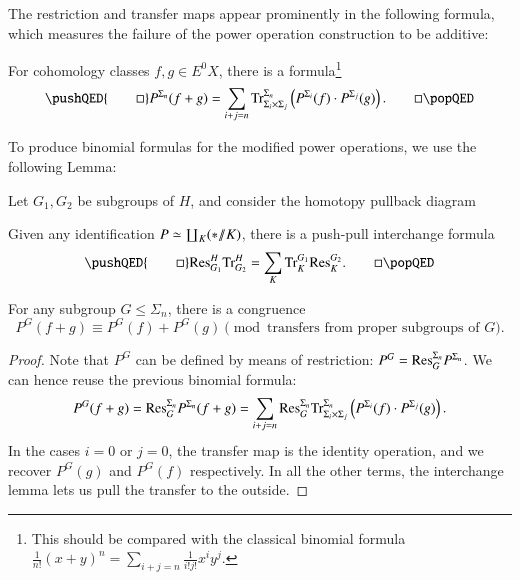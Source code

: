 The restriction and transfer maps appear prominently in the following formula, which measures the failure of the power operation construction to be additive:
\begin{lemma}
For cohomology classes $f, g \in E^0 X$, there is a formula\footnote{This should be compared with the classical binomial formula $\frac{1}{n!} (x + y)^n = \sum_{i+j = n} \frac{1}{i!j!} x^i y^j$.}
\[\pushQED{\qed}
P^{\Sigma_n}(f + g) = \sum_{i + j = n} \Tr_{\Sigma_i \times \Sigma_j}^{\Sigma_n}\left(P^{\Sigma_i}(f) \cdot P^{\Sigma_j}(g)\right). \qedhere
\popQED\]
\end{lemma}

\noindent To produce binomial formulas for the modified power operations, we use the following Lemma:

\begin{lemma}
Let $G_1, G_2$ be subgroups of $H$, and consider the homotopy pullback diagram
\begin{center}
\end{center}
Given any identification $P \simeq \coprod_K (* /\!\!/ K)$, there is a push-pull interchange formula
\[\pushQED{\qed}
\Res_{G_1}^H \Tr_{G_2}^H = \sum_K \Tr^{G_1}_K \Res_K^{G_2}. \qedhere
\popQED\]
\end{lemma}

\begin{corollary}
For any subgroup $G \le \Sigma_n$, there is a congruence \[P^G(f + g) \equiv P^G(f) + P^G(g) \pmod{\text{transfers from proper subgroups of $G$}}.\]
\end{corollary}
\begin{proof}
Note that $P^G$ can be defined by means of restriction: $P^G = \mathrm{Res}^{\Sigma_n}_G P^{\Sigma_n}$.  We can hence reuse the previous binomial formula: \[P^G(f + g) = \mathrm{Res}^{\Sigma_n}_G P^{\Sigma_n}(f + g) = \sum_{i+j = n} \mathrm{Res}^{\Sigma_n}_G \mathrm{Tr}_{\Sigma_i \times \Sigma_j}^{\Sigma_n}\left(P^{\Sigma_i}(f) \cdot P^{\Sigma_j}(g)\right).\]  In the cases $i = 0$ or $j = 0$, the transfer map is the identity operation, and we recover $P^G(g)$ and $P^G(f)$ respectively.  In all the other terms, the interchange lemma lets us pull the transfer to the outside.
\end{proof}

